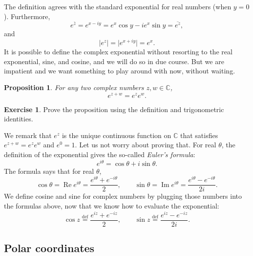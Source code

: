 \documentclass[12pt,openany]{book}
\renewcommand{\Re}{\operatorname{Re}}
\renewcommand{\Im}{\operatorname{Im}}
\newcommand{\sabs}[1]{\lvert {#1} \rvert}
\newcommand{\C}{{\mathbb{C}}}
\newcommand{\myindex}[1]{#1\index{#1}}
\theoremstyle{plain}
\newtheorem{prop}[thm]{Proposition}
\theoremstyle{remark}
\theoremstyle{definition}
\newenvironment{exbox}{%
    \def\FrameCommand{\vrule width 1pt \relax\hspace{10pt}}%
    \MakeFramed{\advance\hsize-\width\FrameRestore}%
}{%
    \endMakeFramed
}
\theoremstyle{exercise}
\newtheorem{exercise}{Exercise}[section]
\theoremstyle{example}
\begin{document}
The definition agrees with the standard exponential for real numbers (when
$y=0$).  Furthermore,
\begin{equation*}
e^{\bar{z}} = 
e^{x-iy} =
e^x\cos y - i e^x \sin y  = \overline{e^{z}} ,
\end{equation*}
and
\begin{equation*}
\sabs{e^{z}} = 
\sabs{e^{x+iy}} =
e^x .
\end{equation*}
It is possible to define the complex exponential without resorting to
the real exponential, sine, and cosine, and we will do so in due course.
But we are impatient and we want something to play around with now, without waiting.

\begin{prop}
For any two complex numbers $z,w \in \C$,
\begin{equation*}
e^{z+w} = e^z e^w .
\end{equation*}
\end{prop}

\begin{exbox}
\begin{exercise}%
Prove the proposition using the definition and trigonometric identities.
\end{exercise}
\end{exbox}

We remark that $e^z$ is the unique continuous
function on $\C$ that satisfies $e^{z+w} = e^z e^w$ and $e^0 = 1$.
Let us not worry about proving that.
For real $\theta$, the definition
of the exponential gives the so-called
\emph{\myindex{Euler's formula}}:
\begin{equation*}
e^{i\theta}
=
\cos \theta + i \sin \theta .
\end{equation*}
The formula says that for real $\theta$,
\begin{equation*}
\cos \theta = \Re e^{i\theta} = \frac{e^{i\theta}+e^{-i\theta}}{2} ,
\qquad
\sin \theta = \Im e^{i\theta} = \frac{e^{i\theta}-e^{-i\theta}}{2i} .
\end{equation*}
We define cosine and sine for complex numbers by plugging
those numbers
into the formulas above, now that we know how to evaluate the exponential:
\begin{equation*}
\cos z \overset{\text{def}}{=} \frac{e^{iz}+e^{-iz}}{2} ,
\qquad
\sin z \overset{\text{def}}{=} \frac{e^{iz}-e^{-iz}}{2i} .
\end{equation*}

\subsection{Polar coordinates}
\end{document}
